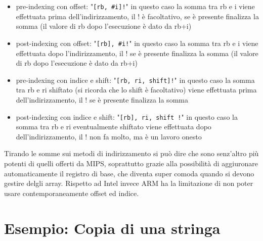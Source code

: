 \documentclass[class=book, crop=false]{standalone}
\begin{document}
\begin{itemize}
	\item pre-indexing con offset: "\texttt{[rb, \#i]!}" in questo caso la somma tra rb e i viene  effettuata prima dell'indirizzamento, il ! è facoltativo, se è presente finalizza la somma (il valore di rb dopo l'esecuzione è dato da rb+i)
	\item post-indexing con offset: "\texttt{[rb], \#i!}" in questo caso la somma tra rb e i viene  effettuata dopo l'indirizzamento, il ! se è presente finalizza la somma (il valore di rb dopo l'esecuzione è dato da rb+i)
	\item pre-indexing con indice e shift: "\texttt{[rb, ri, shift]!}" in questo caso la somma tra rb e ri shiftato (si ricorda che lo shift è facoltativo) viene  effettuata prima dell'indirizzamento, il ! se è presente finalizza la somma
	\item post-indexing con indice e shift: "\texttt{[rb], ri, shift !}" in questo caso la somma tra rb e ri eventualmente shiftato viene  effettuata dopo dell'indirizzamento, il ! non fa molto, ma è un lavoro onesto
\end{itemize}

Tirando le somme sui metodi di indirizzamento si può dire che sono senz'altro più potenti di quelli offerti da MIPS, soprattutto grazie alla possibilità di aggiuronare automaticamente il registro di base, che diventa super comoda quando si devono gestire delgli array. Rispetto ad Intel invece ARM ha la limitazione di non poter usare contemporaneamente offset ed indice.

\section{Esempio: Copia di una stringa}
\end{document}
